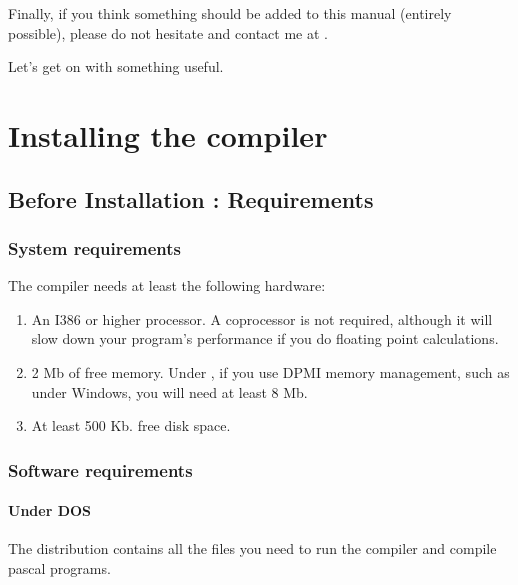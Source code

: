 \documentclass{report}
\begin{document}
Finally, if you think something should be added to this manual 
(entirely possible), please do not hesitate and contact me at 
.

Let's get on with something useful.


\chapter{Installing the compiler}
\label{ch:Installation}

\section{Before Installation : Requirements}

%
%
\subsection{System requirements}
The compiler needs at least the following hardware:
\begin{enumerate}
\item An I386 or higher processor. A coprocessor is not required, although it
will slow down your program's performance if you do floating point calculations.
\item 2 Mb of free memory. Under \dos, if you use DPMI memory management,
such as under Windows, you will need at least 8 Mb.
\item At least 500 Kb. free disk space.
\end{enumerate}

%
%

\subsection{Software requirements}

\subsubsection{Under DOS}
The \dos distribution contains all the files you need to run the compiler
and compile pascal programs.
\end{document}
